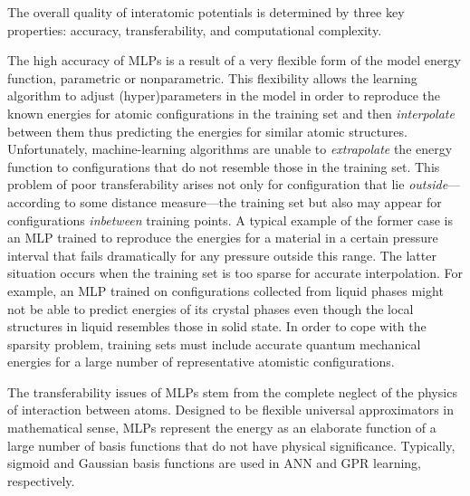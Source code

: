 \documentclass[aip,jcp,reprint,amsmath,amssymb,nature]{revtex4-1}
\begin{document}
The overall quality of interatomic potentials is determined by three key properties: accuracy, transferability, and computational complexity.


The high accuracy of MLPs is a result of a very flexible form of the model energy function, parametric or nonparametric. 
This flexibility allows the learning algorithm to adjust (hyper)parameters in the model in order to reproduce the known energies for atomic configurations in the training set and then \textit{interpolate} between them thus predicting the energies for similar atomic structures. 
Unfortunately, machine-learning algorithms are unable to \textit{extrapolate} the energy function to configurations that do not resemble those in the training set. 
This problem of poor transferability arises not only for configuration that lie \emph{outside}---according to some distance measure---the training set but also may appear for configurations \emph{inbetween} training points. 
A typical example of the former case is an MLP trained to reproduce the energies for a material in a certain pressure interval that fails dramatically for any pressure outside this range. 
The latter situation occurs when the training set is too sparse for accurate interpolation. For example, an MLP trained on configurations collected from liquid phases might not be able to predict energies of its crystal phases even though the local structures in liquid resembles those in solid state. 
In order to cope with the sparsity problem, training sets must include accurate quantum mechanical energies for a large number of representative atomistic configurations.%

The transferability issues of MLPs stem from the complete neglect of the physics of interaction between atoms. 
Designed to be flexible universal approximators in mathematical sense, MLPs represent the energy as an elaborate function of a large number of basis functions that do not have physical significance. Typically, sigmoid and Gaussian basis functions are used in ANN and GPR learning, respectively. 
\end{document}
